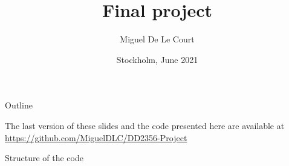 \documentclass[aspectratio=169]{beamer}
\title[Short Title]{%
    \color{white} Final project
    \vspace{0.5cm}
}
\author{Miguel De Le Court}
\institute{
        \textit{Methods in High performance computing}\\
        \textit{DD2356}
        \vspace{0.5cm}
}
\date[Venue and Date]{%
   Stockholm, June 2021 
}
\begin{document}

{
    \maketitle
}

\begin{frame}{Outline}
\tableofcontents

\vfill
\begin{center}
    \footnotesize The last version of these slides and the code presented here are available at \url{https://github.com/MiguelDLC/DD2356-Project}    
\end{center}

\end{frame}





\begin{frame}{Structure of the code}
    \inputminted[tabsize=4,fontsize=\scriptsize,framesep=2mm,bgcolor=codebgcolor,breaklines,linenos]{c}{../core.c}    
\end{frame}
\end{document}

